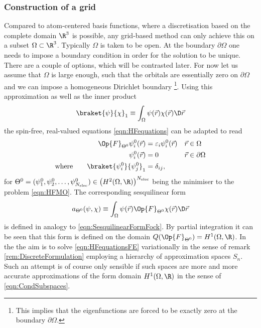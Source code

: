\subsubsection{Construction of a \FE grid}
Compared to atom-centered basis functions,
where a discretisation based on the complete domain $\R^3$ is possible,
any grid-based method can only achieve this
on a subset $\Omega \subset \R^3$.
Typically $\Omega$ is taken to be open.
At the boundary $\partial\Omega$ one needs
to impose a boundary condition in order for the solution to be unique.
There are a couple of options, which will be contrasted later.
For now let us assume that $\Omega$ is large enough,
such that the \SCF orbitals are essentially zero on $\partial\Omega$
and we can impose a homogeneous Dirichlet boundary%
\footnote{This implies that the \HF eigenfunctions are forced
	to be exactly zero at the boundary $\partial\Omega$.}.
Using this approximation
as well as the inner product
\[ \braket{\psi}{\chi}_1 \equiv \int_\Omega \psi(\vec{r}) \chi(\vec{r})  \D \vec{r} \]
the spin-free, real-valued \HF equations \eqref{eqn:HFequations} can be adapted to read
%
\begin{equation}
\label{eqn:HFequationsFE}
\begin{aligned}
	\Op{F}_{\Theta^0} \psi_i^0(\vec{r}) &= \varepsilon_i \psi_i^0(\vec{r}) && \vec{r} \in \Omega \\
	\psi_i^0(\vec{r}) &=0 &&\vec{r} \in \partial \Omega \\
	\text{where}\qquad \braket{\psi_i^0}{\psi_j^0}_1 &= \delta_{ij},
\end{aligned}
\end{equation}
for $\Theta^0 = (\psi_1^0, \psi_2^0, \ldots, \psi_{\Nelec}^0) \in \left( H^2(\Omega,\R) \right)^{\Nelec}$
being the minimiser to the \HF problem \eqref{eqn:HFMO}.
The corresponding sesquilinear form
\[ a_{\Theta^0}(\psi, \chi)
	\equiv \int_\Omega \psi(\vec{r}) \Op{F}_{\Theta^0} \chi(\vec{r}) \D \vec{r} \]
is defined in analogy to \eqref{eqn:SesquilinearFormFock}.
By partial integration it can be seen that this form
is defined on the domain $Q(\Op{F}_{\Theta^0}) = H^1(\Omega, \R)$.
In the 
the aim is to solve \eqref{eqn:HFequationsFE} variationally
in the sense of remark \vref{rem:DiscreteFormulation}
employing a hierarchy of approximation spaces $S_n$.
Such an attempt is of course only sensible
if such spaces are more and more accurate
approximations of the form domain $H^1(\Omega, \R)$
in the sense of \eqref{eqn:CondSubspaces}.

